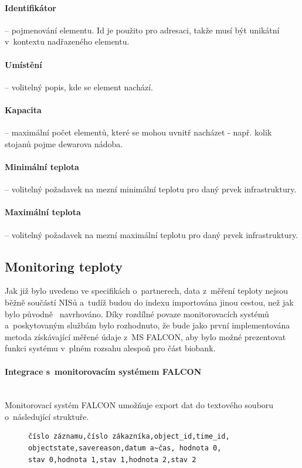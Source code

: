 \documentclass[11pt,draft,oneside]{fithesis2}
\newcommand{\paragraphNewLine}[1]{\paragraph*{#1}\mbox{}\\}
\begin{document}
\paragraph*{Identifikátor} -- pojmenování elementu. Id je použito pro adresaci, takže musí být unikátní v~kontextu nadřazeného elementu.
\paragraph*{Umístění} -- volitelný popis, kde se element nachází.
\paragraph*{Kapacita} -- maximální počet elementů, které se mohou uvnitř nacházet - např. kolik stojanů pojme dewarova nádoba.
\paragraph*{Minimální teplota} -- volitelný požadavek na mezní minimální teplotu pro daný prvek infrastruktury.
\paragraph*{Maximální teplota} -- volitelný požadavek na mezní maximální teplotu pro daný prvek infrastruktury.

\subsection{Monitoring teploty}
Jak již bylo uvedeno ve specifikách o~partnerech, data z~měření teploty nejsou běžně součástí NISů a~tudíž budou do indexu importována jinou cestou, než jak bylo původně~\cite{ARCH_2011_12_29} navrhováno. Díky rozdílné povaze monitorovacích systémů a~poskytovaným službám bylo rozhodnuto, že bude jako první implementována metoda získávající měřené údaje z~MS FALCON, aby bylo možné prezentovat funkci systému v~plném rozsahu alespoň pro část biobank.

\paragraphNewLine{Integrace s~monitorovacím systémem FALCON}
Monitorovací systém FALCON umožňuje export dat do textového souboru o~následující struktuře.

\begin{figure}[h!]
\centering
\begin{BVerbatim}
číslo záznamu,číslo zákazníka,object_id,time_id,
objectstate,savereason,datum a~čas, hodnota 0,
stav 0,hodnota 1,stav 1,hodnota 2,stav 2
\end{BVerbatim}
\end{figure}
\end{document}
